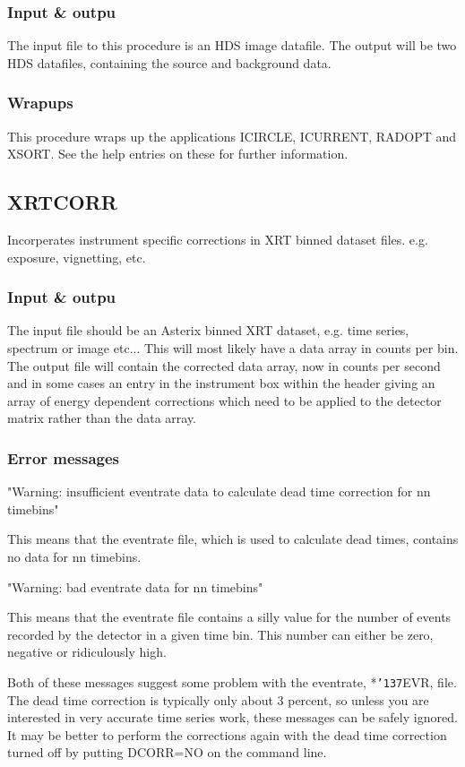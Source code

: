 \documentclass{book}
\renewcommand{\_}{{\tt\char'137}}     %
\begin{document}
\subsubsection{Input \& outpu}
The input file to this procedure is an HDS image datafile. The output
will be two HDS datafiles, containing the source and background data.
 
\subsubsection{Wrapups}
This procedure wraps up the applications ICIRCLE, ICURRENT, RADOPT and XSORT.
See the help entries on these for further information.
\subsection{XRTCORR}
Incorperates instrument specific corrections in XRT binned dataset files.
e.g. exposure, vignetting, etc.
 
\subsubsection{Input \& outpu}
The input file should be an Asterix binned XRT dataset, e.g. time series,
spectrum or image etc... This will most likely have a data array in counts
per bin. The output file will contain the corrected data array, now in
counts per second and in some cases an entry in the instrument box
within the header giving an array of energy dependent corrections which
need to be applied to the detector matrix rather than the data array.
 
\subsubsection{Error messages}
"Warning: insufficient eventrate data to calculate dead time correction
for nn timebins"
 
This means that the eventrate file, which is used to calculate dead times,
contains no data for nn timebins.
 
"Warning: bad eventrate data for nn timebins"
 
This means that the eventrate file contains a silly value for the
number of events recorded by the detector in a given time bin. This
number can either be zero, negative or ridiculously high.
 
Both of these messages suggest some problem with the eventrate, *\_EVR,
file. The dead time correction is typically only about 3 percent, so
unless you are interested in very accurate time series work, these messages
can be safely ignored. It may be better to perform the corrections again
with the dead time correction turned off by putting DCORR=NO on the
command line.
 
\end{document}
